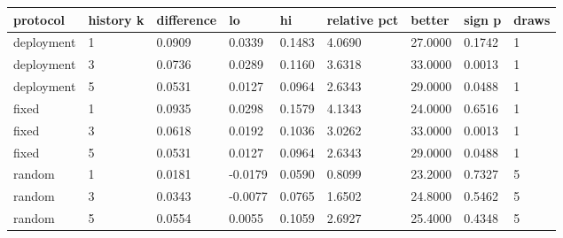 {\footnotesize\setlength{\tabcolsep}{3pt}
\begin{longtable}{lllllllll}
\toprule
\textbf{protocol} & \textbf{history k} & \textbf{difference} & \textbf{lo} & \textbf{hi} & \textbf{relative pct} & \textbf{better} & \textbf{sign p} & \textbf{draws} \\
\midrule
\endhead
deployment & 1 & 0.0909 & 0.0339 & 0.1483 & 4.0690 & 27.0000 & 0.1742 & 1 \\
deployment & 3 & 0.0736 & 0.0289 & 0.1160 & 3.6318 & 33.0000 & 0.0013 & 1 \\
deployment & 5 & 0.0531 & 0.0127 & 0.0964 & 2.6343 & 29.0000 & 0.0488 & 1 \\
fixed & 1 & 0.0935 & 0.0298 & 0.1579 & 4.1343 & 24.0000 & 0.6516 & 1 \\
fixed & 3 & 0.0618 & 0.0192 & 0.1036 & 3.0262 & 33.0000 & 0.0013 & 1 \\
fixed & 5 & 0.0531 & 0.0127 & 0.0964 & 2.6343 & 29.0000 & 0.0488 & 1 \\
random & 1 & 0.0181 & -0.0179 & 0.0590 & 0.8099 & 23.2000 & 0.7327 & 5 \\
random & 3 & 0.0343 & -0.0077 & 0.0765 & 1.6502 & 24.8000 & 0.5462 & 5 \\
random & 5 & 0.0554 & 0.0055 & 0.1059 & 2.6927 & 25.4000 & 0.4348 & 5 \\
\bottomrule
\end{longtable}}
